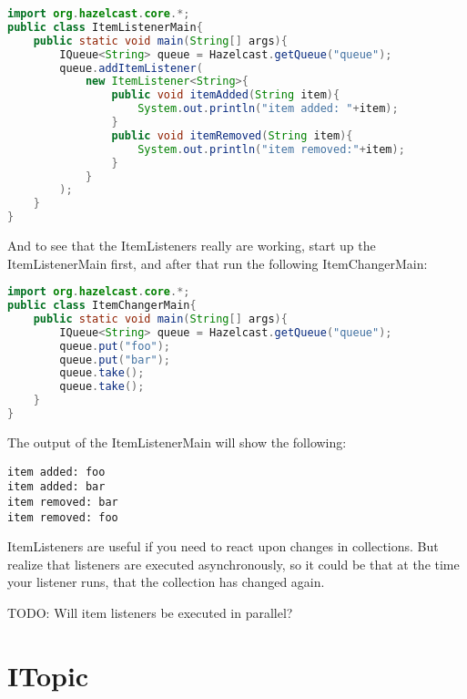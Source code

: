 \begin{lstlisting}[language=java]
import org.hazelcast.core.*;	
public class ItemListenerMain{
    public static void main(String[] args){
        IQueue<String> queue = Hazelcast.getQueue("queue");
        queue.addItemListener(
            new ItemListener<String>{
                public void itemAdded(String item){
                    System.out.println("item added: "+item);
                }
                public void itemRemoved(String item){ 
                    System.out.println("item removed:"+item);
                }
            }
        );
    }
}
\end{lstlisting}

And to see that the ItemListeners really are working, start up the ItemListenerMain
first, and after that run the following ItemChangerMain:

\begin{lstlisting}[language=java]
import org.hazelcast.core.*;	
public class ItemChangerMain{
    public static void main(String[] args){
        IQueue<String> queue = Hazelcast.getQueue("queue");
        queue.put("foo");
        queue.put("bar");
        queue.take();
        queue.take();
    }
}
\end{lstlisting}

The output of the ItemListenerMain will show the following:
\begin{verbatim}
item added: foo
item added: bar
item removed: bar
item removed: foo
\end{verbatim}

ItemListeners are useful if you need to react upon changes in collections. But realize that listeners 
are executed asynchronously, so it could be that at the time your listener runs, that the collection 
has changed again.

TODO: Will item listeners be executed in parallel?

\section{ITopic}

